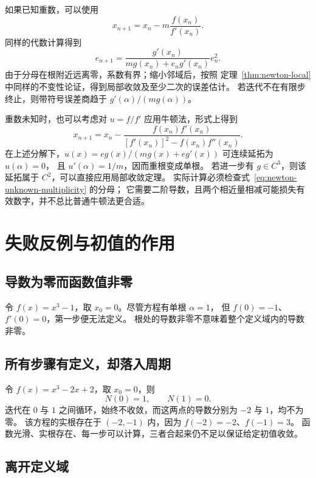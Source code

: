 \documentclass{ctexart}
\begin{document}
如果已知重数，可以使用
\begin{equation}\label{eq:newton-modified}
  x_{n+1}=x_n-m\frac{f(x_n)}{f'(x_n)}.
\end{equation}
同样的代数计算得到
\[
  e_{n+1}=\frac{g'(x_n)}{mg(x_n)+e_ng'(x_n)}e_n^2.
\]
由于分母在根附近远离零，系数有界；缩小邻域后，按照
定理~\ref{thm:newton-local} 中同样的不变性论证，得到局部收敛及至少二次的误差估计。
若迭代不在有限步终止，则带符号误差商趋于 $g'(\alpha)/(mg(\alpha))$。

重数未知时，也可以考虑对 $u=f/f'$ 应用牛顿法，形式上得到
\begin{equation}\label{eq:newton-unknown-multiplicity}
  x_{n+1}=x_n-
  \frac{f(x_n)f'(x_n)}{[f'(x_n)]^2-f(x_n)f''(x_n)}.
\end{equation}
在上述分解下，$u(x)=eg(x)/(mg(x)+eg'(x))$ 可连续延拓为 $u(\alpha)=0$，
且 $u'(\alpha)=1/m$，因而重根变成单根。
若进一步有 $g\in C^3$，则该延拓属于 $C^2$，可以直接应用局部收敛定理。
实际计算必须检查式~\eqref{eq:newton-unknown-multiplicity} 的分母；
它需要二阶导数，且两个相近量相减可能损失有效数字，并不总比普通牛顿法更合适。

\section{失败反例与初值的作用}
\label{sec:newton-failure}

\subsection{导数为零而函数值非零}

令 $f(x)=x^3-1$，取 $x_0=0$。尽管方程有单根 $\alpha=1$，
但 $f(0)=-1$、$f'(0)=0$，第一步便无法定义。
根处的导数非零不意味着整个定义域内的导数非零。

\subsection{所有步骤有定义，却落入周期}

令 $f(x)=x^3-2x+2$，取 $x_0=0$，则
\[
  N(0)=1,\qquad N(1)=0.
\]
迭代在 $0$ 与 $1$ 之间循环，始终不收敛，而这两点的导数分别为 $-2$ 与 $1$，均不为零。
该方程的实根存在于 $(-2,-1)$ 内，因为 $f(-2)=-2$、$f(-1)=3$。
函数光滑、实根存在、每一步可以计算，三者合起来仍不足以保证给定初值收敛。

\subsection{离开定义域}
\end{document}
